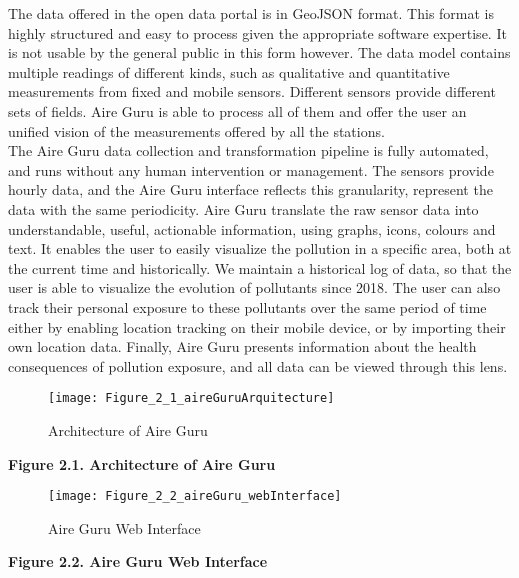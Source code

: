 The data offered in the open data portal is in GeoJSON format.
This format is highly structured and easy to process given the appropriate software expertise. It is not usable by the general public in this form however.
The data model contains multiple readings of different kinds, such as qualitative and quantitative measurements from fixed and mobile sensors.
Different sensors provide different sets of fields.
Aire Guru is able to process all of them and offer the user an unified vision of the measurements offered by all the stations.\\

The Aire Guru data collection and transformation pipeline is fully automated, and runs without any human intervention or management.
The sensors provide hourly data, and the Aire Guru interface reflects this granularity, represent the data with the same periodicity.
Aire Guru translate the raw sensor data into understandable, useful, actionable information, using graphs, icons, colours and text. 
It enables the user to easily visualize the pollution in a specific area, both at the current time and historically. We maintain
a historical log of data, so that the user is able to visualize the evolution of pollutants since 2018. The user can also track their personal exposure
to these pollutants over the same period of time either by enabling location tracking on their mobile device, or by importing their own location
data. Finally, Aire Guru presents information about the health consequences of pollution exposure, and all data can be viewed through this lens.\\

\begin{figure}[ht]
    \centering
    \texttt{[image: Figure\_2\_1\_aireGuruArquitecture]}
    \caption{Architecture of Aire Guru}
\end{figure}

\begin{center}
    \bf Figure 2.1. Architecture of Aire Guru\\
\end{center}

\begin{figure}[ht]
    \centering
    \texttt{[image: Figure\_2\_2\_aireGuru\_webInterface]}
    \caption{Aire Guru Web Interface}
\end{figure}

\begin{center}
    \bf Figure 2.2. Aire Guru Web Interface\\
\end{center}

